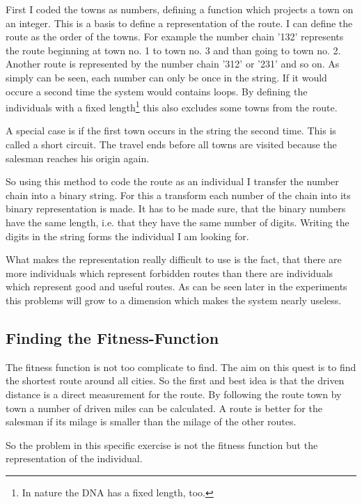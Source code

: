 First I coded the towns as numbers, defining a function which projects a town
on an integer. This is a basis to define a representation of the route. I can
define the route as the order of the towns. For example the number chain '132'
represents the route beginning at town no. 1 to town no. 3 and than going to
town no. 2. Another route is represented by the number chain '312' or '231' and
so on. As simply can be seen, each number can only be once in the string. If it
would occure a second time the system would contains loops. By defining the individuals
with a fixed length\footnote{In nature the DNA has a fixed length, too.} this
also excludes some towns from the route.

A special case is if the first town occurs in the string the second time. This
is called a short circuit. The travel ends before all towns are visited because
the salesman reaches his origin again.

So using this method to code the route as an individual I transfer the number
chain into a binary string. For this a transform each number of the chain into
its binary representation is made. It has to be made sure, that the binary numbers
have the same length, i.e. that they have the same number of digits. Writing
the digits in the string forms the individual I am looking for.

What makes the representation really difficult to use is the fact, that there
are more individuals which represent forbidden routes than there are individuals
which represent good and useful routes. As can be seen later in the experiments
this problems will grow to a dimension which makes the system nearly useless.

\subsection{Finding the Fitness-Function}
The fitness function is not too complicate to find. The aim on this quest is to
find the shortest route around all cities. So the first and best idea is that
the driven distance is a direct measurement for the route. By following the route
town by town a number of driven miles can be calculated. A route is better for the
salesman if its milage is smaller than the milage of the other routes.

So the problem in this specific exercise is not the fitness function but the representation
of the individual.
